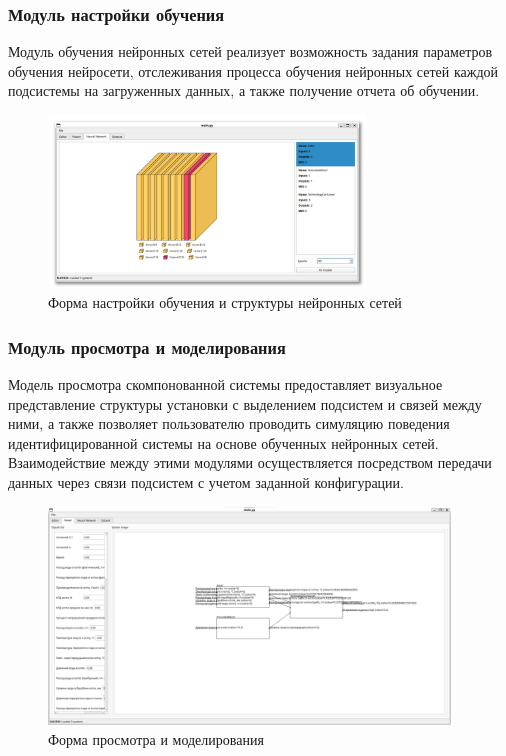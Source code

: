\subsubsection{Модуль настройки обучения}

Модуль обучения нейронных сетей реализует возможность задания параметров
обучения нейросети, отслеживания процесса обучения нейронных сетей каждой
подсистемы на загруженных данных, а также получение отчета об обучении. 

\begin{figure}[H]
  \begin{center}
    \includegraphics[width=0.75\textwidth]{figures/modules/neural.png}
  \end{center}
  \caption{Форма настройки обучения и структуры нейронных
  сетей}\label{fig:forms:neural}
\end{figure}

\subsubsection{Модуль просмотра и моделирования}

Модель просмотра скомпонованной системы предоставляет визуальное представление
структуры установки с выделением подсистем и связей между ними, а также
позволяет пользователю проводить симуляцию поведения идентифицированной системы
на основе обученных нейронных сетей. Взаимодействие между этими модулями
осуществляется посредством передачи данных через связи подсистем с учетом
заданной конфигурации.

\begin{figure}[H]
  \begin{center}
    \includegraphics[width=0.95\textwidth]{figures/modules/modelling.png}
  \end{center}
  \caption{Форма просмотра и моделирования}\label{fig:forms:viewer}
\end{figure}

